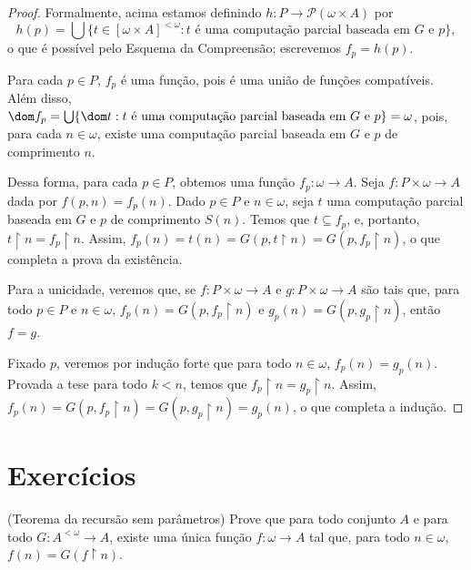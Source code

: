 \begin{proof}
    Formalmente, acima estamos definindo $h:P\to\mathcal P(\omega\times A)$ por
    \[h(p)=\bigcup \{t \in [\omega\times A]^{<\omega}: t \text{ é uma computação parcial baseada em } G \text{ e } p\},
    \]
    o que é possível pelo Esquema da Compreensão; escrevemos $f_p=h(p)$.

    Para cada $p \in P$, $f_p$ é uma função, pois é uma união de funções compatíveis.
    Além disso, $\dom f_p = \bigcup\{\dom t: t \text{ é uma computação parcial baseada em } G \text{ e } p\}=\omega$, pois, para cada $n\in \omega$, existe uma computação parcial baseada em $G$ e $p$ de comprimento $n$.

    Dessa forma, para cada $p \in P$, obtemos uma função $f_p: \omega\to A$.
    Seja $f:P\times \omega\to A$ dada por $f(p, n)=f_p(n)$.
    Dado $p \in P$ e $n \in \omega$, seja $t$ uma computação parcial baseada em $G$ e $p$ de comprimento $S(n)$.
    Temos que $t\subseteq f_p$, e, portanto, $t\restriction n= f_p\restriction n$.
    Assim, $f_p(n)=t(n)=G(p, t\restriction n)=G(p, f_p\restriction n)$, o que completa a prova da existência.

    Para a unicidade, veremos que, se $f:P\times \omega\to A$ e $g:P\times \omega\to A$ são tais que, para todo $p \in P$ e $n\in \omega$, $f_p(n)=G(p, f_p\restriction n)$ e $g_p(n)=G(p, g_p\restriction n)$, então $f=g$.

    Fixado $p$, veremos por indução forte que para todo $n\in \omega$, $f_p(n)=g_p(n)$.
    Provada a tese para todo $k<n$, temos que $f_p\restriction n=g_p\restriction n$.
    Assim, $f_p(n)=G(p, f_p\restriction n)=G(p, g_p\restriction n)=g_p(n)$, o que completa a indução.
\end{proof}

\section*{Exercícios}
\begin{exercise}[$Z^-$](Teorema da recursão sem parâmetros)
    Prove que para todo conjunto $A$ e para todo $G: A^{<\omega}\to A$, existe uma única função $f:\omega\to A$ tal que, para todo $n\in \omega$, $f(n)=G(f\restriction n)$.
\end{exercise}
